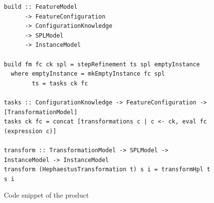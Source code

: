 \begin{figure}
\begin{lstlisting}
build :: FeatureModel
      -> FeatureConfiguration
      -> ConfigurationKnowledge
      -> SPLModel
      -> InstanceModel

build fm fc ck spl = stepRefinement ts spl emptyInstance
  where emptyInstance = mkEmptyInstance fc spl
        ts = tasks ck fc

tasks :: ConfigurationKnowledge -> FeatureConfiguration -> [TransformationModel]
tasks ck fc = concat [transformations c | c <- ck, eval fc (expression c)]

transform :: TransformationModel -> SPLModel -> InstanceModel -> InstanceModel
transform (HephaestusTransformation t) s i = transformHpl t s i
\end{lstlisting}
\caption{Code snippet of the \hp{} product}
\label{fig:code-hp-product}
\end{figure}

%
%
%
%
%
%


